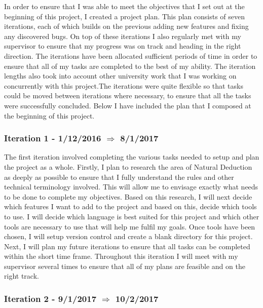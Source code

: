 In order to ensure that I was able to meet the objectives that I set out at the beginning of this project, I created a project plan. This plan consists of seven iterations, each of which builds on the previous adding new features and fixing any discovered bugs. On top of these iterations I also regularly met with my supervisor to ensure that my progress was on track and heading in the right direction. The iterations have been allocated sufficient periods of time in order to ensure that all of my tasks are completed to the best of my ability. The iteration lengths also took into account other university work that I was working on concurrently with this project.The iterations were quite flexible so that tasks could be moved between iterations where necessary, to ensure that all the tasks were successfully concluded. Below I have included the plan that I composed at the beginning of this project. 


\subsubsection{Iteration 1 - 1/12/2016 $\Rightarrow$ 8/1/2017}

The first iteration involved completing the various tasks needed to setup and plan the project as a whole. Firstly, I plan to research the area of Natural Deduction as deeply as possible to ensure that I fully understand the rules and other technical terminology involved. This will allow me to envisage exactly what needs to be done to complete my objectives. Based on this research, I will next decide which features I want to add to the project and based on this, decide which tools to use. I will decide which language is best suited for this project and which other tools are necessary to use that will help me fulfil my goals. Once tools have been chosen, I will setup version control and create a blank directory for this project. Next, I will plan my future iterations to ensure that all tasks can be completed within the short time frame. Throughout this iteration I will meet with my supervisor several times to ensure that all of my plans are feasible and on the right track.

\subsubsection{Iteration 2 - 9/1/2017 $\Rightarrow$ 10/2/2017}


